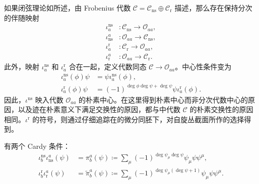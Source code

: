 如果闭弦理论如所述，由 Frobenius 代数 $\mathcal{C}=\mathcal{C}_{\mathrm{ns}}\oplus\mathcal{C}_{\mathrm{r}}$ 描述，那么存在保持分次的伴随映射
\begin{equation}\label{eq:2.47}
\begin{aligned}
\iota_a^{\mathrm{ns}}&\colon\mathcal{C}_{\mathrm{ns}}\longrightarrow\mathcal{O}_{aa},\\
\iota_{\mathrm{ns}}^a&\colon\mathcal{O}_{aa}\longrightarrow\mathcal{C}_{\mathrm{ns}},\\
\iota_a^{\mathrm{r}}&\colon\mathcal{C}_{\mathrm{r}}\longrightarrow\mathcal{O}_{aa},\\
\iota_{\mathrm{r}}^a&\colon\mathcal{O}_{aa}\longrightarrow\mathcal{C}_{\mathrm{r}}.
\end{aligned}
\end{equation}
此外，映射 $\iota_a^{\mathrm{ns}}$ 和 $\iota_a^{\mathrm{r}}$ 合在一起，定义代数同态 $\mathcal{C}\to\mathcal{O}_{aa}$。中心性条件变为
\begin{equation}\label{eq:2.48}
\begin{aligned}
\iota_a^{\mathrm{ns}}(\phi)\psi&=\psi\iota_a^{\mathrm{ns}}(\phi),\\
\iota_a^{\mathrm{r}}(\phi)\psi&=(-1)^{\deg\phi\deg\psi+\deg\psi}\psi\iota_a^{\mathrm{r}}(\phi).
\end{aligned}
\end{equation}
因此，$\iota^{\mathrm{ns}}$ 映入代数 $\mathcal{O}_{aa}$ 的朴素中心。在这里得到朴素中心而非分次代数中心的原因，以及迹在朴素意义下满足交换性的原因，都与中代数 $\mathcal{C}$ 的朴素交换性的原因相同。$\iota^{\mathrm{r}}$ 的符号，则通过仔细追踪在的微分同胚下，对自旋丛截面所作的选择得到。

有两个 Cardy 条件：
\begin{equation}\label{eq:2.49}
\begin{aligned}
\iota_b^{\mathrm{ns}}\iota_{\mathrm{ns}}^a(\psi)
&=\pi_b^a(\psi)\coloneqq\sum_\mu(-1)^{\deg\psi_\mu\deg\psi}\psi_\mu\psi\psi^\mu,\\
\iota_b^{\mathrm{r}}\iota_{\mathrm{r}}^a(\psi)
&=\widetilde{\pi}_b^a(\psi)\coloneqq\sum_\mu(-1)^{\deg\psi_\mu(\deg\psi+1)}\psi_\mu\psi\psi^\mu.
\end{aligned}
\end{equation}

